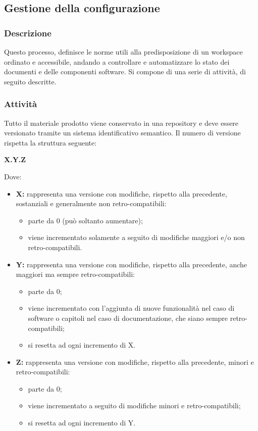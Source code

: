   \subsection{Gestione della configurazione}
    \subsubsection{Descrizione}
      Questo processo, definisce le norme utili alla predisposizione di un workspace ordinato e accessibile, andando a controllare e automatizzare lo stato dei documenti e delle componenti software. Si compone di una serie di attività, di seguito descritte.
    \subsubsection{Attività}
        Tutto il materiale prodotto viene conservato in una repository e deve essere versionato tramite un sistema identificativo semantico. Il numero di versione rispetta la struttura seguente:
        \begin{center}
          \textbf{X.Y.Z}
        \end{center}
        Dove:
        \begin{itemize}
          \item \textbf{X:} rappresenta una versione con modifiche, rispetto alla precedente, sostanziali e generalmente non retro-compatibili:
            \begin{itemize}
              \item parte da 0 (può soltanto aumentare);
              \item viene incrementato solamente a seguito di modifiche maggiori e/o non retro-compatibili.
            \end{itemize}
          \item \textbf{Y:} rappresenta una versione con modifiche, rispetto alla precedente, anche maggiori ma sempre retro-compatibili:
            \begin{itemize}
              \item parte da 0;
              \item viene incrementato con l'aggiunta di nuove funzionalità nel caso di software o capitoli nel caso di documentazione, che siano sempre retro-compatibili;
              \item si resetta ad ogni incremento di X.
            \end{itemize}
          \item \textbf{Z:} rappresenta una versione con modifiche, rispetto alla precedente, minori e retro-compatibili:
            \begin{itemize}
              \item parte da 0;
              \item viene incrementato a seguito di modifiche minori e retro-compatibili;
              \item si resetta ad ogni incremento di Y.
            \end{itemize}
        \end{itemize}

